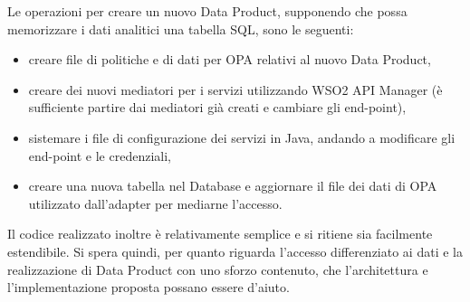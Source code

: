 \documentclass[12pt]{report}
\begin{document}
Le operazioni per creare un nuovo Data Product, supponendo che possa memorizzare i dati analitici una tabella SQL, sono le seguenti: 
\begin{itemize}
    \item creare file di politiche e di dati per OPA relativi al nuovo Data Product,
    \item creare dei nuovi mediatori per i servizi utilizzando WSO2 API Manager (è sufficiente partire dai mediatori già creati e cambiare gli end-point),
    \item sistemare i file di configurazione dei servizi in Java, andando a modificare gli end-point e le credenziali,
    \item creare una nuova tabella nel Database e aggiornare il file dei dati di OPA utilizzato dall'adapter per mediarne l'accesso.
\end{itemize} 
Il codice realizzato inoltre è relativamente semplice e si ritiene sia facilmente estendibile.
Si spera quindi, per quanto riguarda l'accesso differenziato ai dati e la realizzazione di Data Product con uno sforzo contenuto, che l'architettura e l'implementazione proposta possano essere d'aiuto.
\end{document}
